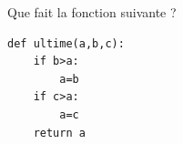 \begin{exo}{}
	Que fait la fonction suivante ?

	\begin{lstlisting}
def ultime(a,b,c):
    if b>a:
        a=b
    if c>a:
        a=c
    return a
\end{lstlisting}
\end{exo}
